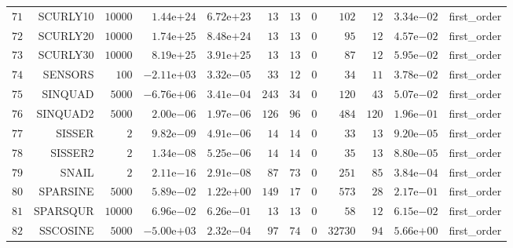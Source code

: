 \begin{longtable}{rrrrrrrrrrrr}
  \(    71\) & SCURLY10 & \( 10000\) & \( 1.44\)e\(+24\) & \( 6.72\)e\(+23\) & \(    13\) & \(    13\) & \(     0\) & \(   102\) & \(    12\) & \( 3.34\)e\(-02\) & first\_order \\
  \(    72\) & SCURLY20 & \( 10000\) & \( 1.74\)e\(+25\) & \( 8.48\)e\(+24\) & \(    13\) & \(    13\) & \(     0\) & \(    95\) & \(    12\) & \( 4.57\)e\(-02\) & first\_order \\
  \(    73\) & SCURLY30 & \( 10000\) & \( 8.19\)e\(+25\) & \( 3.91\)e\(+25\) & \(    13\) & \(    13\) & \(     0\) & \(    87\) & \(    12\) & \( 5.95\)e\(-02\) & first\_order \\
  \(    74\) & SENSORS & \(   100\) & \(-2.11\)e\(+03\) & \( 3.32\)e\(-05\) & \(    33\) & \(    12\) & \(     0\) & \(    34\) & \(    11\) & \( 3.78\)e\(-02\) & first\_order \\
  \(    75\) & SINQUAD & \(  5000\) & \(-6.76\)e\(+06\) & \( 3.41\)e\(-04\) & \(   243\) & \(    34\) & \(     0\) & \(   120\) & \(    43\) & \( 5.07\)e\(-02\) & first\_order \\
  \(    76\) & SINQUAD2 & \(  5000\) & \( 2.00\)e\(-06\) & \( 1.97\)e\(-06\) & \(   126\) & \(    96\) & \(     0\) & \(   484\) & \(   120\) & \( 1.96\)e\(-01\) & first\_order \\
  \(    77\) & SISSER & \(     2\) & \( 9.82\)e\(-09\) & \( 4.91\)e\(-06\) & \(    14\) & \(    14\) & \(     0\) & \(    33\) & \(    13\) & \( 9.20\)e\(-05\) & first\_order \\
  \(    78\) & SISSER2 & \(     2\) & \( 1.34\)e\(-08\) & \( 5.25\)e\(-06\) & \(    14\) & \(    14\) & \(     0\) & \(    35\) & \(    13\) & \( 8.80\)e\(-05\) & first\_order \\
  \(    79\) & SNAIL & \(     2\) & \( 2.11\)e\(-16\) & \( 2.91\)e\(-08\) & \(    87\) & \(    73\) & \(     0\) & \(   251\) & \(    85\) & \( 3.84\)e\(-04\) & first\_order \\
  \(    80\) & SPARSINE & \(  5000\) & \( 5.89\)e\(-02\) & \( 1.22\)e\(+00\) & \(   149\) & \(    17\) & \(     0\) & \(   573\) & \(    28\) & \( 2.17\)e\(-01\) & first\_order \\
  \(    81\) & SPARSQUR & \( 10000\) & \( 6.96\)e\(-02\) & \( 6.26\)e\(-01\) & \(    13\) & \(    13\) & \(     0\) & \(    58\) & \(    12\) & \( 6.15\)e\(-02\) & first\_order \\
  \(    82\) & SSCOSINE & \(  5000\) & \(-5.00\)e\(+03\) & \( 2.32\)e\(-04\) & \(    97\) & \(    74\) & \(     0\) & \( 32730\) & \(    94\) & \( 5.66\)e\(+00\) & first\_order \\

\end{longtable}
